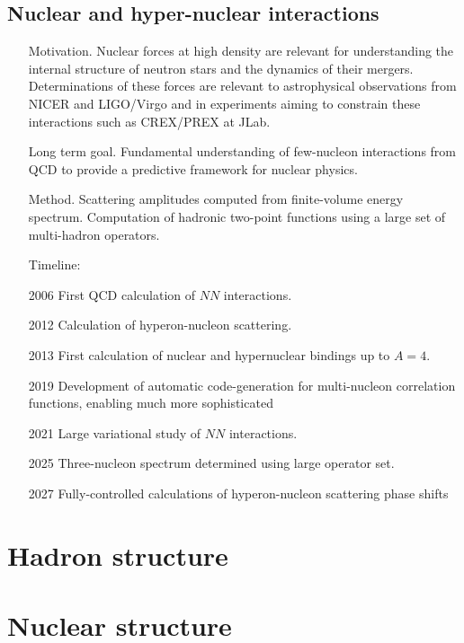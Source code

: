 \documentclass{article}
\begin{document}
\subsection{Nuclear and hyper-nuclear interactions}

\begin{itemize}
    \item[Motivation.] Nuclear forces at high density are relevant for understanding  the internal structure  of neutron stars and the dynamics of their mergers. Determinations of these forces are relevant to astrophysical observations from NICER and LIGO/Virgo and in experiments aiming to constrain  these interactions such as CREX/PREX at JLab.
    
    \item[Long term goal.] Fundamental understanding of few-nucleon interactions from QCD to provide a predictive framework for nuclear physics. 
    
    \item[Method.] Scattering
      amplitudes computed from finite-volume energy spectrum. Computation of hadronic two-point functions
      using a large set of multi-hadron operators.
      
\item[Timeline:]
    \item[2006] First QCD calculation of $NN$ interactions.
    \item[2012] Calculation of hyperon-nucleon scattering.
    \item[2013] First calculation of nuclear and hypernuclear bindings up to $A=4$.
    \item[2019] Development of automatic code-generation for multi-nucleon correlation functions, enabling much more sophisticated 
    \item[2021] Large variational study of $NN$ interactions.
    \item[2025] Three-nucleon spectrum determined using large operator set.
    \item[2027] Fully-controlled calculations of hyperon-nucleon scattering phase shifts
    
\end{itemize}


\section{Hadron structure}\label{sec:hadstruct}


\section{Nuclear structure}\label{sec:nucstruct}
\end{document}
